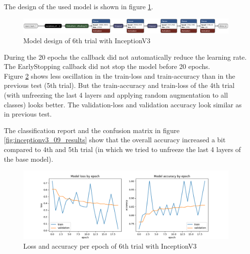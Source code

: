 \documentclass{article}
\begin{document}
The design of the used model is shown in figure \ref{fig:inceptionv3_09.keras_model_design}.
\begin{figure}%
    \centering
    \includegraphics[width=1.0\linewidth]{inceptionv3_09.keras_model_design_nice.png}
    \caption{Model design of 6th trial with InceptionV3}
    \label{fig:inceptionv3_09.keras_model_design}
\end{figure}

During the 20 epochs the callback did not automatically reduce the learning rate. The EarlyStopping callback did not stop the model before 20 epochs.\\

Figure \ref{fig:inceptionv3_09_loss_accuracy} shows less oscillation in the train-loss and train-accuracy than in the previous test (5th trial). But the train-accuracy and train-loss of the 4th trial (with unfreezing the last 4 layers and applying random augmentation to all classes) looks better. The validation-loss and validation accuracy look similar as in previous test. 

The classification report and the confusion matrix in figure \ref{fig:inceptionv3_09_results} show that the overall accuracy increased a bit compared to 4th and 5th trial (in which we tried to unfreeze the last 4 layers of the base model).\\ 

\begin{figure}%
    \centering
    \includegraphics[width=1.0\linewidth]{inceptionv3_09_loss_accuracy.png}
    \caption{Loss and accuracy per epoch of 6th trial with InceptionV3}
    \label{fig:inceptionv3_09_loss_accuracy}
\end{figure}
\end{document}
